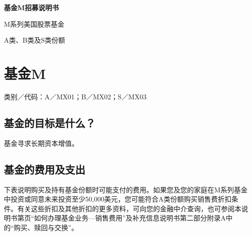 \documentclass[UTF8,fontset=none,11pt,a4paper]{ctexart}
\begin{document}
{\noindent\fontsize{20}{25}\selectfont\bfseries 基金M招募说明书\par}
\vspace{10pt}
M系列美国\allowbreak\mbox{股票基金}

A类、B类及S类份额






\par{}\label{originalpage1}
\section*{基金M}\label{unitU051}
\noindent 类别／代码：A／MX01；B／MX02；S／MX03\par\smallskip
\subsection*{基金的目标是什么？}
基金寻求长期\allowbreak\mbox{资本增值。}

\subsection*{基金的费用及支出}
下表说明购买及持有基金份额时可能支付的费用。如果您及您的家庭在M系列基金中投资或同意未来投资至少50,000美元，您可能符合A类份额购买销售费折扣条件。有关这些折扣及其他折扣的更多资料，可向您的金融中介查询，也可参阅本说明书第\pageref{unitU475}页“如何办理基金业务—销售费用”及补充信息说明书第二部分附录A中的“购买、赎\allowbreak\mbox{回与交换”。}
\end{document}
